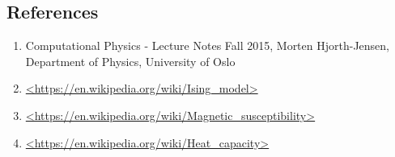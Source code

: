 \documentclass[12pt]{article}
\begin{document}
\begin{flushleft}
\section{References}
\begin{enumerate}
	\item Computational Physics - Lecture Notes Fall 2015, Morten Hjorth-Jensen, Department of Physics, University of Oslo
	\item \url{<https://en.wikipedia.org/wiki/Ising_model>}
	\item \url{<https://en.wikipedia.org/wiki/Magnetic_susceptibility>}
	\item \url{<https://en.wikipedia.org/wiki/Heat_capacity>}
\end{enumerate}

















\end{flushleft}
\end{document}
